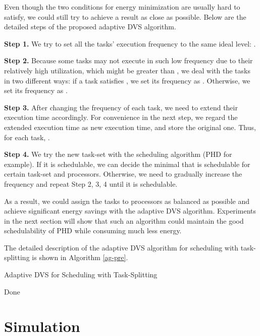 \documentclass[12pt, journal,compsoc]{IEEEtran}
\begin{document}
Even though the two conditions for energy minimization are usually hard to satisfy, we could still try to achieve a result as close as possible. Below are the detailed steps of the proposed adaptive DVS algorithm.

\textbf{Step 1.} We try to set all the tasks' execution frequency to the same ideal level: .

\textbf{Step 2.} Because some tasks may not execute in such low frequency due to their relatively high utilization, which might be greater than , we deal with the tasks in two different ways: if a task  satisfies , we set its frequency  as . Otherwise, we set its frequency  as .

\textbf{Step 3.} After changing the frequency of each task, we need to extend their execution time accordingly. For convenience in the next step, we regard the extended execution time as new execution time, and store the original one. Thus, for each task, .

\textbf{Step 4.} We try the new task-set with the scheduling algorithm (PHD for example). If it is schedulable, we can decide the minimal  that is schedulable for certain task-set and processors. Otherwise, we need to gradually increase the frequency  and repeat Step 2, 3, 4 until it is schedulable.

As a result, we could assign the tasks to processors as balanced as possible and achieve significant energy savings with the adaptive DVS algorithm. Experiments in the next section will show that such an algorithm could maintain the good schedulability of PHD while consuming much less energy.

The detailed description of the adaptive DVS algorithm for scheduling with task-splitting is shown in Algorithm \ref{ag-pre}.

\begin{algorithm}
\caption{Adaptive DVS for Scheduling with Task-Splitting}
\label{ag-pre}
\begin{algorithmic}[1]
\STATE 
\ENDFOR
{}
\IF{}
\STATE 
\STATE 
\ELSE
\STATE 
\STATE 
\ENDIF
\ENDFOR
\IF{}
\STATE Done
\ELSE
{}
\STATE 
\ENDFOR
\ENDIF
\ENDFOR
\end{algorithmic}
\end{algorithm}

\section{Simulation}
\label{sim}
\end{document}

